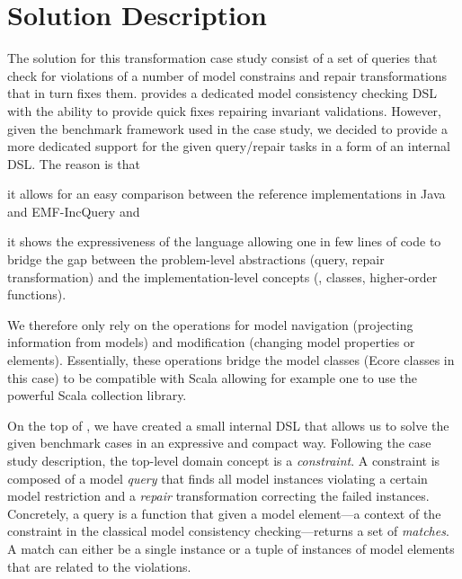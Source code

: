 

\section{Solution Description}
\label{sec:SolutionDescription}

The solution for this transformation case study consist of a set of queries that check for violations of a number of model constrains and repair transformations that in turn fixes them.
\SIGMA provides a dedicated model consistency checking DSL with the ability to provide quick fixes repairing invariant validations.
However, given the benchmark framework used in the case study, we decided to provide a more dedicated support for the given query/repair tasks in a form of an internal DSL.
The reason is that
%
\begin{inparaenum}[(1)]
  \item it allows for an easy comparison between the reference implementations in Java and EMF-IncQuery and
  \item it shows the expressiveness of the language allowing one in few lines of code to bridge the gap between the problem-level abstractions (query, repair transformation) and the implementation-level concepts (\Eg, classes, higher-order functions).
\end{inparaenum}
%
We therefore only rely on the \SIGMA operations for model navigation (\Ie projecting information from models) and modification (\Ie changing model properties or elements).
Essentially, these operations bridge the model classes (Ecore classes in this case) to be compatible with Scala allowing for example one to use the powerful Scala collection library.

On the top of \SIGMA, we have created a small internal DSL that allows us to solve the given benchmark cases in an expressive and compact way.
Following the case study description, the top-level domain concept is a \emph{constraint}.
A constraint is composed of a model \emph{query} that finds all model instances violating a certain model restriction and a \emph{repair} transformation correcting the failed instances.
Concretely, a query is a function that given a model element---\Ie a context of the constraint in the classical model consistency checking---returns a set of \emph{matches}.
A match can either be a single instance or a tuple of instances of model elements that are related to the violations.

